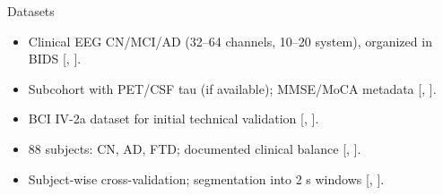 \documentclass{beamer}
\renewcommand{\parencite}[1]{[\citeauthor{#1}, \citeyear{#1}]}
\renewcommand{\cite}[1]{\parencite{#1}}
\begin{document}
\begin{frame}{Datasets}
  \begin{itemize}
  \item Clinical EEG CN/MCI/AD (32–64 channels, 10–20 system), organized in BIDS {\tiny\cite{gil2023dataset, schirrmeister2017deep}}.
  \item Subcohort with PET/CSF tau (if available); MMSE/MoCA metadata {\tiny\cite{depaula2009tau, ajra2023deep}}.
  \item BCI IV-2a dataset for initial technical validation {\tiny\cite{blankertz2008bci}}.
  \item 88 subjects: CN, AD, FTD; documented clinical balance {\tiny\cite{gil2023dataset}}.
  \item Subject-wise cross-validation; segmentation into 2 s windows {\tiny\cite{lawhern2018eegnet, schirrmeister2017deep}}.
\end{itemize}
\end{frame}
\end{document}
